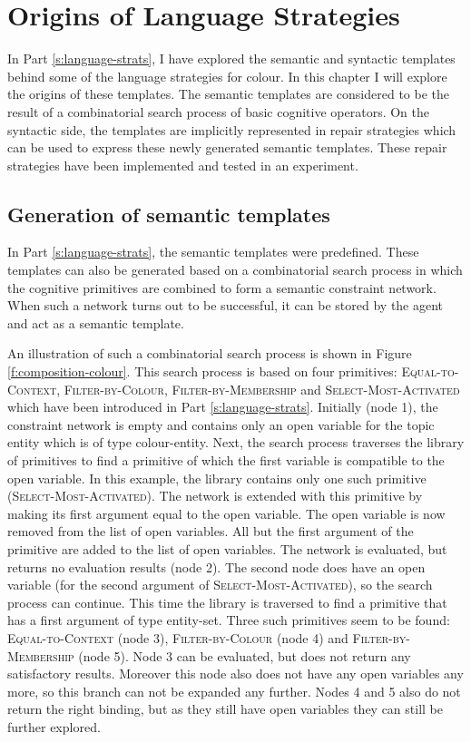 \chapter{Origins of Language Strategies}
\label{s:composition}

In Part \ref{s:language-strats}, I have explored the semantic and
syntactic templates behind some of the language strategies for
colour. In this chapter I will explore the origins of these
templates. The semantic templates are considered to be the result of a
combinatorial search process of basic cognitive operators. On the
syntactic side, the templates are implicitly represented in repair
strategies which can be used to express these newly generated semantic
templates. These repair strategies have been implemented and tested in
an experiment.

\section{Generation of semantic templates}

In Part \ref{s:language-strats}, the semantic templates were
predefined. These templates can also be generated based on a
combinatorial search process in which the cognitive primitives are
combined to form a semantic constraint network. When such a network
turns out to be successful, it can be stored by the agent and act as
a semantic template.

An illustration of such a combinatorial search process is shown in
Figure \ref{f:composition-colour}. This search process is based on
four primitives: \textsc{Equal-to-Context}, \textsc{Filter-by-Colour},
\textsc{Filter-by-Membership} and \textsc{Select-Most-Acti\-vated}
which have been introduced in Part \ref{s:language-strats}. Initially
(node 1), the constraint network is empty and contains only an open
variable for the topic entity which is of type colour-entity. Next,
the search process traverses the library of primitives to find a
primitive of which the first variable is compatible to the open
variable. In this example, the library contains only one such
primitive (\textsc{Select-Most-Activated}). The network is extended
with this primitive by making its first argument equal to the open
variable. The open variable is now removed from the list of open
variables. All but the first argument of the primitive are added to
the list of open variables. The network is evaluated, but returns no
evaluation results (node 2). The second node does have an open
variable (for the second argument of \textsc{Select-Most-Activated}),
so the search process can continue. This time the library is traversed
to find a primitive that has a first argument of type
entity-set. Three such primitives seem to be found:
\textsc{Equal-to-Context} (node 3), \textsc{Filter-by-Colour} (node 4)
and \textsc{Filter-by-Membership} (node 5). Node 3 can be evaluated,
but does not return any satisfactory results. Moreover this node also does not
have any open variables any more, so this branch can not be expanded
any further. Nodes 4 and 5 also do not return the right binding, but as
they still have open variables they can still be further explored.

